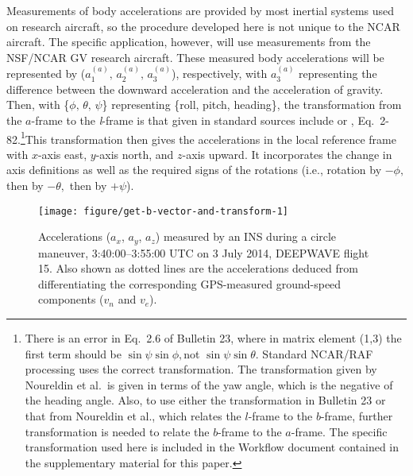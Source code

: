 \documentclass[english,british,amt,bookmarks=false,unicode=true]{copernicus}\usepackage[]{graphicx}\usepackage[]{color}
\makeatletter
\def\maxwidth{ %
  \ifdim\Gin@nat@width>\linewidth
    \linewidth
  \else
    \Gin@nat@width
  \fi
}
\newenvironment{knitrout}{}{} %
\makeatother
\begin{document}
Measurements of body accelerations are provided by most inertial
systems used on research aircraft, so the procedure developed here
is not unique to the NCAR aircraft. The specific application, however,
will use measurements from the NSF/NCAR GV research aircraft. These
measured body accelerations will be represented by ($a_{1}^{(a)},\,a_{2}^{(a)},\,a_{3}^{(a)}$),
respectively, with $a_{3}^{(a)}$ representing the difference between
the downward acceleration and the acceleration of gravity. Then, with
\{$\phi,\,\theta,\,\psi$\} representing \{roll, pitch, heading\},
the transformation from the $a$-frame to the \emph{l}-frame is that
given in standard sources include \citet{Bulletin23} or \citet{noureldin2013fundamentals},
Eq.~2-82.\footnote{There is an error in Eq.~2.6 of Bulletin 23, where in matrix element
(1,3) the first term should be $\sin\psi\sin\phi,$not $\sin\psi\sin\theta$.
Standard NCAR/RAF processing uses the correct transformation. The
transformation given by Noureldin et al.~is given in terms of the
yaw angle, which is the negative of the heading angle. Also, to use
either the transformation in Bulletin 23 or that from Noureldin et
al., which relates the $l$-frame to the $b$-frame, further transformation
is needed to relate the $b$-frame to the $a$-frame. The specific
transformation used here is included in the Workflow document contained
in the supplementary material for this paper.}This transformation then gives the accelerations in the local reference
frame with $x$-axis east, $y$-axis north, and $z$-axis upward.
It incorporates the change in axis definitions as well as the required
signs of the rotations (i.e., rotation by $-\phi,$ then by $-\theta,$
then by $+\psi$). 








\begin{knitrout}
\color{fgcolor}\begin{figure}
\texttt{[image: figure/get-b-vector-and-transform-1]} \caption[Accelerations (]{Accelerations ($a_x$, $a_y$, $a_z$) measured by an INS during a circle maneuver, 3:40:00--3:55:00 UTC on 3 July 2014, DEEPWAVE flight 15. Also shown as dotted lines are the accelerations deduced from differentiating the corresponding GPS-measured ground-speed components ($v_n$ and $v_e$).}\label{fig:get-b-vector-and-transform}
\end{figure}


\end{knitrout}
\end{document}
